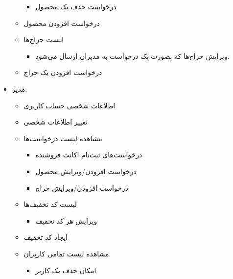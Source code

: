 \documentclass[]{article}
\begin{document}
\begin{itemize}
\begin{itemize}
\begin{itemize}[label={$\blacksquare$}]
\item
درخواست حذف یک محصول

\end{itemize}

\item
درخواست افزودن محصول 
\newpage

\item
لیست حراج‌ها

\begin{itemize}[label={$\blacksquare$}]
\item
ویرایش حراج‌ها که بصورت یک درخواست به مدیران ارسال می‌شود.
\end{itemize}


\item
درخواست افزودن یک حراج

\end{itemize}


\item
مدیر:

\begin{itemize}


\item
اطلاعات شخصی حساب کاربری

\item
تغییر اطلاعات شخصی

\item
مشاهده لیست درخواست‌ها

\begin{itemize}[label={$\blacksquare$}]
\item
درخواست‌های ثبت‌نام اکانت فروشنده

\item
درخواست افزودن/ویرایش محصول

\item
درخواست افزودن/ویرایش حراج

\end{itemize}

\item
لیست کد تخفیف‌ها

\begin{itemize}[label={$\blacksquare$}]
\item
ویرایش هر کد تخفیف
\end{itemize}

\item
ایجاد کد تخفیف

\item
مشاهده لیست تمامی کاربران

\begin{itemize}[label={$\blacksquare$}]
\item
امکان حذف یک کاربر
\end{itemize}


\end{itemize}
\end{itemize}
\end{document}
